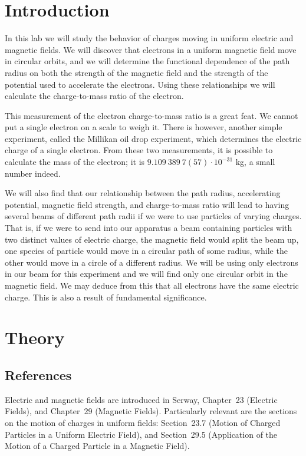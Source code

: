 

\section{Introduction}
\label{sec:ed:intro}

In this lab we will study the behavior of charges moving in uniform electric
and magnetic fields. We will discover that electrons in a uniform magnetic
field move in circular orbits, and we will determine the functional dependence 
of the path radius on both the strength of the magnetic field and the strength 
of the potential used to accelerate the electrons. Using these relationships we
will calculate the charge-to-mass ratio of the electron. 

This measurement of the electron charge-to-mass ratio is a great feat.  We 
cannot put a single electron on a scale to weigh it. There is however, another 
simple experiment, called the Millikan oil drop experiment, which determines 
the electric charge of a single electron.  From these two measurements, it is 
possible to calculate the mass of the electron; it is 
$9.109~389~7(57)\cdot 10^{-31}$ kg, a small number indeed.

We will also find that our relationship between the path radius, accelerating
potential, magnetic field strength, and charge-to-mass ratio will lead to 
having several beams of different path radii if we were to use particles of 
varying charges.  That is, if we were to send into our apparatus a beam 
containing particles with two distinct values of electric charge, the magnetic 
field would split the beam up, one species of particle would move in a circular
path of some radius, while the other would move in a circle of a different 
radius. We will be using only electrons in our beam for this experiment and we 
will find only one circular orbit in the magnetic field. We may deduce from 
this that all electrons have the same electric charge. This is also a result
of fundamental significance. 

\section{Theory}

\subsection{References}

Electric and magnetic fields are introduced in Serway, Chapter~23 (Electric 
Fields), and Chapter~29 (Magnetic Fields). Particularly 
relevant are the sections on the motion of charges in uniform fields:
Section~23.7 (Motion of Charged Particles in a Uniform Electric Field), 
 and Section~29.5 (Application of the Motion of a Charged Particle in a Magnetic Field).     

